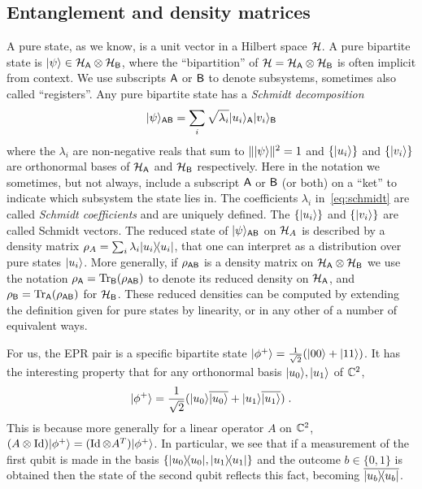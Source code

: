 \subsection{Entanglement and density matrices}

A pure state, as we know, is a unit vector in a Hilbert space $\mathcal{H}$. A pure bipartite state is $|\psi\rangle \in \mathcal{H}_{\textsf{A}} \otimes \mathcal{H}_{\textsf{B}}$, where the ``bipartition'' of $\mathcal{H} = \mathcal{H}_{\textsf{A}} \otimes \mathcal{H}_{\textsf{B}}$ is often implicit from context. We use subscripts ${\textsf{A}}$ or ${\textsf{B}}$ to denote subsystems, sometimes also called ``registers''. Any pure bipartite state has a \emph{Schmidt decomposition} 
\begin{equation}\label{eq:schmidt}
|\psi\rangle_{{\textsf{AB}}} = \sum_i \sqrt{\lambda_i} |u_i\rangle_{{\textsf{A}}} |v_i\rangle_{{\textsf{B}}}
\end{equation}
where the $\lambda_i$ are non-negative reals that sum to $\||\psi\rangle\|^2=1$ and $\{|u_i\rangle\}$ and $\{|v_i\rangle\}$ are orthonormal bases of $\mathcal{H}_{\textsf{A}}$ and $\mathcal{H}_{\textsf{B}}$ respectively. Here in the notation we sometimes, but not always, include a subscript ${\textsf{A}}$ or ${\textsf{B}}$ (or both) on a ``ket'' to indicate which subsystem the state lies in. 
 The coefficients $\lambda_i$ in~\eqref{eq:schmidt} are called \emph{Schmidt coefficients} and are uniquely defined. The  $\{|u_i\rangle\}$ and  $\{|v_i\rangle\}$ are called Schmidt vectors. The reduced state of $|\psi\rangle_{{\textsf{AB}}}$ on $\mathcal{H}_A$ is described by a density matrix $\rho_A = \sum_i \lambda_i |u_i\rangle\!\langle u_i|$, that one can interpret as a distribution over pure states $|u_i\rangle$. More generally, if $\rho_{{\textsf{AB}}}$ is a density matrix on  $\mathcal{H}_{\textsf{A}} \otimes \mathcal{H}_{\textsf{B}}$  we use the notation $\rho_{{\textsf{A}}} = \mbox{\rm Tr}_{{\textsf{B}}}(\rho_{{\textsf{AB}}})$ to denote its reduced density on $\mathcal{H}_{\textsf{A}}$, and $\rho_{{\textsf{B}}}=\mbox{\rm Tr}_{{\textsf{A}}}(\rho_{{\textsf{AB}}})$ for $\mathcal{H}_{\textsf{B}}$. These reduced densities can be computed by extending the definition given for pure states by linearity, or in any other of a number of equivalent ways. 

For us, the EPR pair is a specific bipartite state $|\phi^+\rangle = \frac{1}{\sqrt{2}}(|00\rangle+|11\rangle)$. It has the interesting property that for any orthonormal basis $|u_0\rangle,|u_1\rangle$ of $\mathbb{C}^2$, 
\begin{equation}\label{eq:epr-shift}
|\phi^+\rangle = \frac{1}{\sqrt{2}}(|u_0\rangle\overline{|u_0\rangle}+|u_1\rangle\overline{|u_1\rangle})\;.
\end{equation} This is because more generally for a linear operator $A$ on $\mathbb{C}^2$, $(A\otimes \mathop{\rm Id}\nolimits)|\phi^+\rangle = (\mathop{\rm Id}\nolimits\otimes A^T)|\phi^+\rangle$. In particular, we see that if a measurement of the first qubit is made in the basis $\{|u_0\rangle\!\langle u_0|,|u_1\rangle\!\langle u_1|\}$ and the outcome $b\in \{0,1\}$ is obtained then the state of the second qubit reflects this fact, becoming $\overline{|u_b\rangle\!\langle u_b|}$. 


